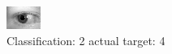 \begin{figure}[h!]
\begin{center}
\includegraphics[width=0.60\columnwidth]{figures/ID818_class_2_target_4.png}
\end{center}
\caption{ Classification: 2 actual target: 4}
\label{fig:ID818_class_2_target_4}
\end{figure}
